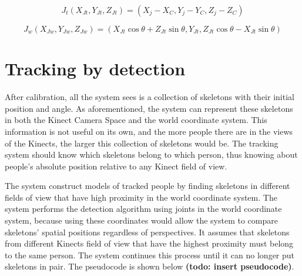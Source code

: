 \begin{equation}
\label{eq:joint_translated}
J_t (X_{Jt}, Y_{Jt}, Z_{Jt}) = (X_j - X_C, Y_j - Y_C, Z_j - Z_C)
\end{equation}

\begin{equation}
\label{eq:joint_worldview}
J_w (X_{Jw}, Y_{Jw}, Z_{Jw}) = (X_{Jt}\cos\theta + Z_{Jt}\sin\theta, Y_{Jt}, Z_{Jt}\cos\theta - X_{Jt}\sin\theta)
\end{equation}




\section{Tracking by detection}
\label{sec:current_approach_tracking_by_detection}

After calibration, all the system sees is a collection of skeletons with their initial position and angle. As aforementioned, the system can represent these skeletons in both the Kinect Camera Space and the world coordinate system. This information is not useful on its own, and the more people there are in the views of the Kinects, the larger this collection of skeletons would be. The tracking system should know which skeletons belong to which person, thus knowing about people's absolute position relative to any Kinect field of view.

The system construct models of tracked people by finding skeletons in different fields of view that have high proximity in the world coordinate system. The system performs the detection algorithm using joints in the world coordinate system, because using these coordinates would allow the system to compare skeletons' spatial positions regardless of perspectives. It assumes that skeletons from different Kinects field of view that have the highest proximity must belong to the same person. The system continues this process until it can no longer put skeletons in pair. The pseudocode is shown below \textbf{(todo: insert pseudocode)}.

